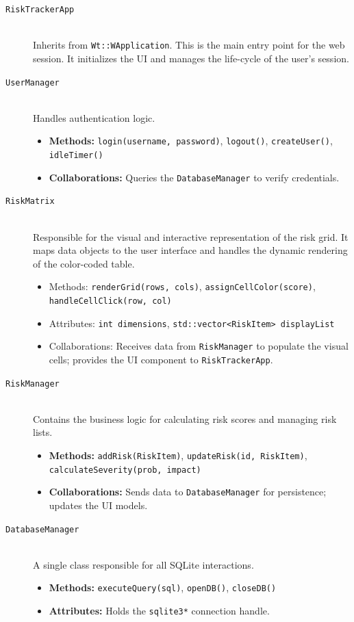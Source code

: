 \documentclass[letterpaper,12pt,oneside,listof=totoc,parskip=full]{scrreprt}
\begin{document}
\begin{description}
    \item[\texttt{RiskTrackerApp}] \hfill \\
    Inherits from \texttt{Wt::WApplication}. This is the main entry point for the web session. It initializes the UI and manages the life-cycle of the user's session.

    \item[\texttt{UserManager}] \hfill \\
    Handles authentication logic.
    \begin{itemize}
        \item \textbf{Methods:} \texttt{login(username, password)}, \texttt{logout()}, \texttt{createUser()}, \texttt{{idleTimer()}}
        \item \textbf{Collaborations:} Queries the \texttt{DatabaseManager} to verify credentials.
    \end{itemize}
    \item[\texttt{RiskMatrix}] \hfill \\
    Responsible for the visual and interactive representation of the risk grid. It maps data objects to the user interface and handles the dynamic rendering of the color-coded table.
    \begin{itemize}
        \item Methods: \texttt{renderGrid(rows, cols)}, \texttt{assignCellColor(score)}, \texttt{handleCellClick(row, col)}
        \item Attributes: \texttt{int dimensions}, \texttt{std::vector<RiskItem> displayList}
        \item Collaborations: Receives data from \texttt{RiskManager} to populate the visual cells; provides the UI component to \texttt{RiskTrackerApp}.
    \end{itemize}
    \item[\texttt{RiskManager}] \hfill \\
    Contains the business logic for calculating risk scores and managing risk lists.
    \begin{itemize}
        \item \textbf{Methods:} \texttt{addRisk(RiskItem)}, \texttt{updateRisk(id, RiskItem)}, \texttt{calculateSeverity(prob, impact)}
        \item \textbf{Collaborations:} Sends data to \texttt{DatabaseManager} for persistence; updates the UI models.
    \end{itemize}

    \item[\texttt{DatabaseManager}] \hfill \\
    A single class responsible for all SQLite interactions.
    \begin{itemize}
        \item \textbf{Methods:} \texttt{executeQuery(sql)}, \texttt{openDB()}, \texttt{closeDB()}
        \item \textbf{Attributes:} Holds the \texttt{sqlite3*} connection handle.
    \end{itemize}


\end{description}
\end{document}
